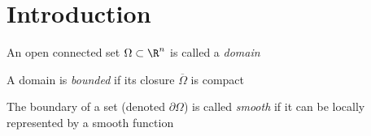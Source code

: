 \section{Introduction}
\begin{theo}[Domain]{}
  An open connected set $\Omega\subset\R^n$ is called a \textit{domain}
\end{theo}
\par\bigskip
\begin{theo}{}
  A domain is \textit{bounded} if its closure $\overline{\Omega}$ is compact 
\end{theo}
\par\bigskip
\begin{theo}{}
  The boundary of a set (denoted $\partial \Omega$) is called \textit{smooth} if it can be locally represented by a smooth function
\end{theo}
\par\bigskip
